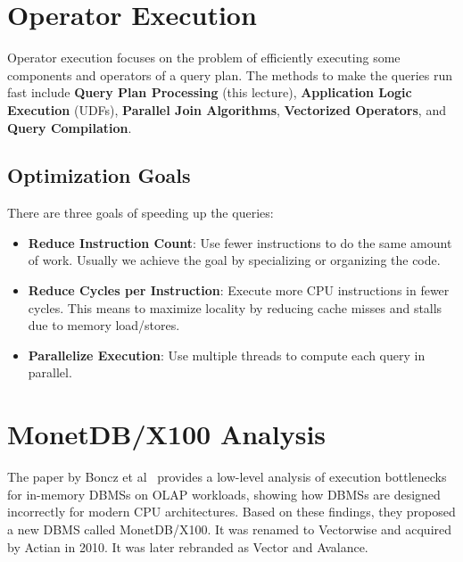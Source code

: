 \documentclass[11pt]{article}
\begin{document}
\maketitle
\thispagestyle{plain}

\section{Operator Execution}
Operator execution focuses on the problem of efficiently executing some components and operators of a query plan. The methods to make the queries run fast include \textbf{Query Plan Processing} (this lecture), \textbf{Application Logic Execution} (UDFs), \textbf{Parallel Join Algorithms}, \textbf{Vectorized Operators}, and \textbf{Query Compilation}.

\subsection*{Optimization Goals}
There are three goals of speeding up the queries:
\begin{itemize}
    \item \textbf{Reduce Instruction Count}: Use fewer instructions to do the same amount of work. Usually we achieve the goal by specializing or organizing the code.
    \item \textbf{Reduce Cycles per Instruction}: Execute more CPU instructions in fewer cycles. This means to maximize locality by reducing cache misses and stalls due to memory load/stores.
    \item \textbf{Parallelize Execution}: Use multiple threads to compute each query in parallel.
\end{itemize}

\section{MonetDB/X100 Analysis}
The paper by Boncz et al~\cite{DBLP:conf/cidr/BonczZN05} provides a low-level analysis of execution bottlenecks for in-memory DBMSs on OLAP workloads, showing how DBMSs are designed incorrectly for modern CPU architectures. Based on these findings, they proposed a new DBMS called MonetDB/X100. It was renamed to Vectorwise and acquired by Actian in 2010. It was later rebranded as Vector and Avalance.
\end{document}
